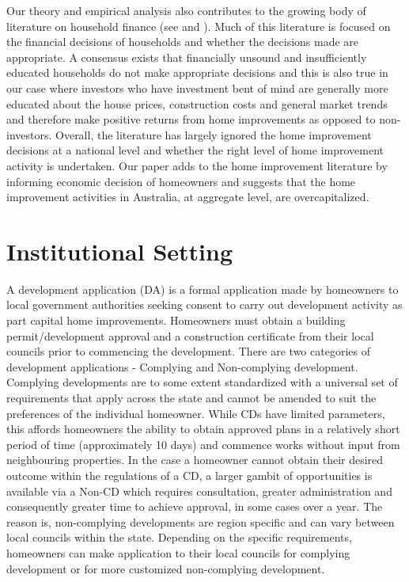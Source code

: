 \documentclass[AEJ,reqno, draftmode]{AEA} %
\begin{document}
Our theory and empirical analysis also contributes to the growing body of literature on household finance (see \cite{barber2011behavior} and \cite{campbell2006household}). Much of this literature is focused on the financial decisions of households and whether the decisions made are appropriate. A consensus exists that financially unsound and insufficiently educated households do not make appropriate decisions and this is also true in our case where investors who have investment bent of mind are generally more educated about the house prices, construction costs and general market trends and therefore make positive returns from home improvements as opposed to non-investors. Overall, the literature has largely ignored the home improvement decisions at a national level and whether the right level of home improvement activity is undertaken. Our paper adds to the home improvement literature by informing economic decision of homeowners and suggests that the home improvement activities in Australia, at aggregate level, are overcapitalized.


\section{Institutional Setting}

A development application (DA) is a formal application made by homeowners to local government authorities seeking consent to carry out development activity as part capital home improvements. Homeowners must obtain a building permit/development approval and a construction certificate from their local councils prior to commencing the development. There are two categories of development applications - Complying and Non-complying development. Complying developments are to some extent standardized with a universal set of requirements that apply across the state and cannot be amended to suit the preferences of the individual homeowner. While CDs have limited parameters, this affords homeowners the ability to obtain approved plans in a relatively short period of time (approximately 10 days) and commence works without input from neighbouring properties. In the case a homeowner cannot obtain their desired outcome within the regulations of a CD, a larger gambit of opportunities is available via a Non-CD which requires consultation, greater administration and consequently greater time to achieve approval, in some cases over a year. The reason is, non-complying developments are region specific and can vary between local councils within the state. Depending on the specific requirements, homeowners can make application to their local councils for complying development or for more customized non-complying development.
\end{document}
